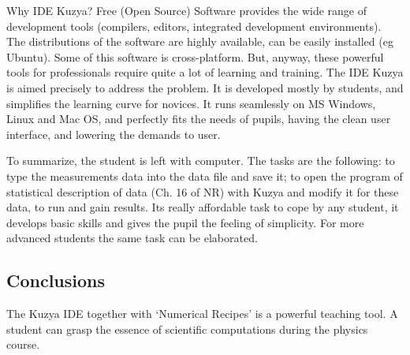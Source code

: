 \documentclass[10pt, a5paper]{article}
\begin{document}
Why IDE Kuzya? Free (Open Source) Software provides the wide range of development tools (compilers, editors, integrated development environments). The distributions of the software are highly available, can be easily installed (eg Ubuntu). Some of this software is cross-platform. But, anyway, these powerful tools for professionals require quite a lot of learning and training. The IDE Kuzya is aimed precisely to address the problem. It is  developed mostly by students, and simplifies the learning curve for novices. It runs seamlessly on MS Windows, Linux and Mac OS, and perfectly fits the needs of pupils, having the clean user interface, and lowering the demands to user.

To summarize, the student is left with computer. The tasks are the following: to type the measurements data into the data file and save it; to open the program of statistical description of data (Ch. 16 of NR) with Kuzya and modify it for these data, to run and gain results. Its really affordable task to cope by any student, it develops basic skills and gives the pupil the feeling of simplicity. For more advanced students the same task can be elaborated. 
 
\subsection*{Conclusions}

The Kuzya IDE together with `Numerical Recipes' is a powerful teaching tool. A student can grasp the essence of scientific computations during the physics course.
\end{document}
